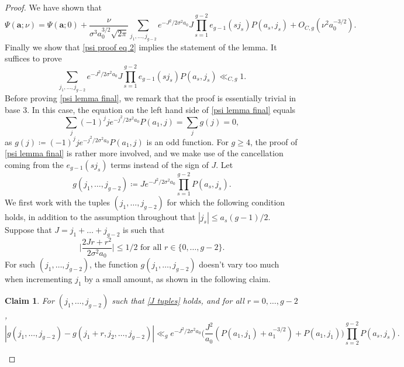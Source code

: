 \documentclass[hidelinks,11pt,reqno]{amsart}
\renewcommand{\leq}{\leqslant}
\renewcommand{\geq}{\geqslant}
\newcommand{\ru}[1]{e_{g-1}(#1)}
\newtheorem{claim}[prop]{Claim}
\theoremstyle{remark}
\begin{document}
\begin{proof}
    We have shown that
    \begin{equation}\label{psi proof eq 2}
        \Psi(\mathbf{a};\nu)=\Psi(\mathbf{a};0)+\frac{\nu}{\sigma^{3}a_{0}^{3/2}\sqrt{2\pi}}\sum_{j_{1},\ldots, j_{g-2}}e^{-J^{2}/2\sigma^{2}a_{0}}J\prod_{s=1}^{g-2}\ru{sj_{s}}P(a_{s},j_{s})+O_{C,g}(\nu^{2}a_{0}^{-3/2}).
    \end{equation}
    Finally we show that \cref{psi proof eq 2} implies the statement of the lemma. It suffices to prove
    \begin{equation}\label{psi lemma final}
        \sum_{j_{1},\ldots, j_{g-2}}e^{-J^{2}/2\sigma^{2}a_{0}}J\prod_{s=1}^{g-2}\ru{sj_{s}}P(a_{s},j_{s})\ll_{C,g} 1.
    \end{equation}
Before proving \cref{psi lemma final}, we remark that the proof is essentially trivial in base 3. In this case, the equation on the left hand side of \cref{psi lemma final} equals
\[\sum_{j}(-1)^{j}je^{-j^{2}/2\sigma^{2}a_{0}}P(a_{1},j)=\sum_{j}g(j)=0,\]
as $g(j)\coloneq (-1)^{j}je^{-j^{2}/2\sigma^{2}a_{0}}P(a_{1},j)$ is an odd function. For $g\geq 4$, the proof of \cref{psi lemma final} is rather more involved, and we make use of the cancellation coming from the $\ru{sj_{s}}$ terms instead of the sign of $J$. Let
\begin{equation}\label{g defn}
        g(j_{1},\ldots, j_{g-2})\coloneq Je^{-J^{2}/2\sigma^{2}a_{0}}\prod_{s=1}^{g-2}P(a_{s},j_{s}).
    \end{equation}
We first work with the tuples $(j_{1},\ldots, j_{g-2})$ for which the following condition holds, in addition to the assumption throughout that $|j_{s}|\leq a_{s}(g-1)/2$. Suppose that $J=j_{1}+\ldots+j_{g-2}$ is such that
\begin{equation}\label{J tuples}
    \Big|\frac{2Jr+r^{2}}{2\sigma^{2}a_{0}}\Big |\leq 1/2\textrm{ for all  }r\in \{0,\ldots, g-2\}.
\end{equation}
For such $(j_{1},\ldots, j_{g-2})$, the function $g(j_{1},\ldots, j_{g-2})$ doesn't vary too much when incrementing $j_{1}$ by a small amount, as shown in the following claim.
\begin{claim}\label{g claim}
    For $(j_{1},\ldots, j_{g-2})$ such that \cref{J tuples} holds, and for all $r=0,\ldots, g-2$,
    \[|g(j_{1},\ldots, j_{g-2})-g(j_{1}+r,j_{2},\ldots, j_{g-2})|\ll_{g} e^{-J^{2}/2\sigma^{2}a_{0}}\Big (\frac{J^{2}}{a_{0}}(P(a_{1},j_{1})+a_{1}^{-3/2})+P(a_{1},j_{1})\Big )\prod_{s=2}^{g-2}P(a_{s},j_{s}).\]
\end{claim}


\end{proof}
\end{document}
